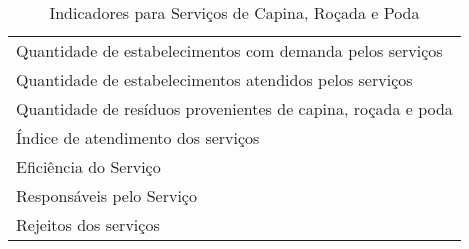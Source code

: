 \begin{table}[h!]
  \centering
  \caption{Indicadores para Serviços de Capina, Roçada e Poda}
\begin{tabular}{|p{27.145em}|}
	\rowcolor[rgb]{ .984,  .831,  .706} \multicolumn{1}{p{27.145em}}{SERVIÇOS DE CAPINA, ROÇADA E PODA} \\
	\midrule
	Quantidade de estabelecimentos com demanda pelos serviços \\
	\midrule
	Quantidade de estabelecimentos atendidos pelos serviços \\
	\midrule
	Quantidade de resíduos provenientes de capina, roçada e poda \\
	\midrule
	Índice de atendimento dos serviços \\
	\midrule
	Eficiência do Serviço \\
	\midrule
	Responsáveis pelo Serviço \\
	\midrule
	Rejeitos dos serviços \\
	\bottomrule
\end{tabular}%

  \label{tab:ind_capina}%
\end{table}%
